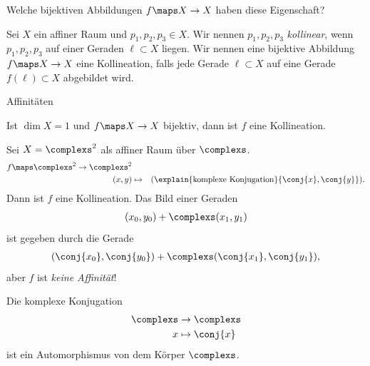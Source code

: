 \begin{frage*}
    Welche bijektiven Abbildungen \( f\maps X\to X \) haben diese Eigenschaft?
\end{frage*}
\begin{definition*}
    Sei \( X \) ein affiner Raum und \( p_1,p_2,p_3\in X \). Wir nennen \( p_1,p_2,p_3 \) \emph{kollinear}, wenn \( p_1,p_2,p_3 \) auf einer Geraden \( \ell \subset X \) liegen. Wir nennen eine bijektive Abbildung \( f\maps X\to X \) eine Kollineation, falls jede Gerade \( \ell \subset X \) auf eine Gerade \( f(\ell)\subset X \) abgebildet wird.
\end{definition*}
\begin{beispiel}
    Affinitäten
\end{beispiel}
\begin{beispiel}
    Ist \( \dim X=1 \) und \( f\maps X\to X \) bijektiv, dann ist \( f \) eine Kollineation.
\end{beispiel}
\begin{beispiel}\label{kollinieationen:beispiele:komplexe_konjugation}
    Sei \( X=\complexs^2 \) als affiner Raum über \( \complexs \).
    \begin{align*}
        f\maps \begin{aligned}[t]
            \complexs^2\to \complexs^2\\
            (x,y)&\mapsto &(\explain{\text{komplexe Konjugation}}{\conj{x},\conj{y          }}).
        \end{aligned}
    \end{align*}
    Dann ist \( f \) eine Kollineation. Das Bild einer Geraden
    \begin{align*}
        (x_0,y_0)+\complexs(x_1,y_1)
    \end{align*}
    ist gegeben durch die Gerade
    \begin{align*}
        (\conj{x_0},\conj{y_0})+\complexs(\conj{x_1},\conj{y_1}),
    \end{align*}
    aber \( f \) ist \emph{keine Affinität}!
\end{beispiel}
\begin{bemerkung*}
    Die komplexe Konjugation
    \begin{align*}
        \begin{aligned}[t]
            \complexs&\to \complexs\\
            x&\mapsto \conj{x}
        \end{aligned}
    \end{align*}
    ist ein Automorphismus von dem Körper \( \complexs \).
\end{bemerkung*}

